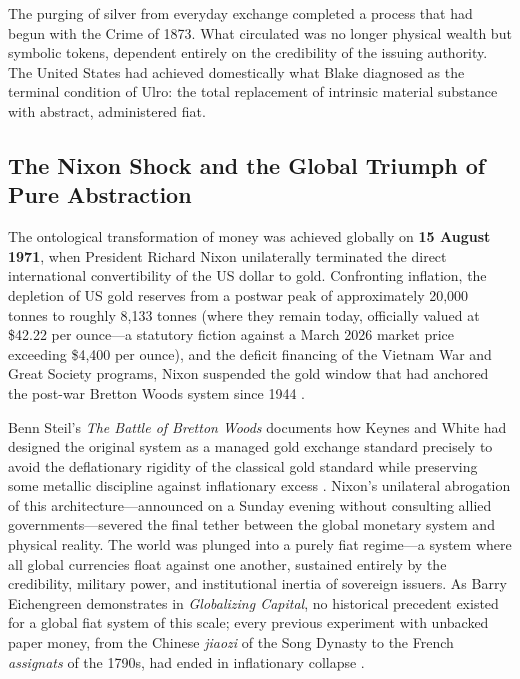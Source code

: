 \documentclass[
]{article}
\begin{document}
The purging of silver from everyday exchange completed a process that
had begun with the Crime of 1873. What circulated was no longer physical
wealth but symbolic tokens, dependent entirely on the credibility of the
issuing authority. The United States had achieved domestically what
Blake diagnosed as the terminal condition of Ulro: the total replacement
of intrinsic material substance with abstract, administered fiat.

\subsection{The Nixon Shock and the Global Triumph of Pure
Abstraction}\label{the-nixon-shock-and-the-global-triumph-of-pure-abstraction}

The ontological transformation of money was achieved globally on
\textbf{15 August 1971}, when President Richard Nixon unilaterally
terminated the direct international convertibility of the US dollar to
gold. Confronting inflation, the depletion of US gold reserves from a
postwar peak of approximately 20,000 tonnes to roughly 8,133 tonnes
(where they remain today, officially valued at \$42.22 per ounce---a
statutory fiction against a March 2026 market price exceeding \$4,400
per ounce), and the deficit financing of the Vietnam War and Great
Society programs, Nixon suspended the gold window that had anchored the
post-war Bretton Woods system since 1944
\citep{steil2013battle, eichengreen2019globalizing}.

Benn Steil's \emph{The Battle of Bretton Woods} documents how Keynes and
White had designed the original system as a managed gold exchange
standard precisely to avoid the deflationary rigidity of the classical
gold standard while preserving some metallic discipline against
inflationary excess \citep{steil2013battle}. Nixon's unilateral
abrogation of this architecture---announced on a Sunday evening without
consulting allied governments---severed the final tether between the
global monetary system and physical reality. The world was plunged into
a purely fiat regime---a system where all global currencies float
against one another, sustained entirely by the credibility, military
power, and institutional inertia of sovereign issuers. As Barry
Eichengreen demonstrates in \emph{Globalizing Capital}, no historical
precedent existed for a global fiat system of this scale; every previous
experiment with unbacked paper money, from the Chinese \emph{jiaozi} of
the Song Dynasty to the French \emph{assignats} of the 1790s, had ended
in inflationary collapse \citep{eichengreen2019globalizing}.
\end{document}
